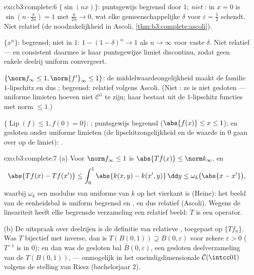 \begin{solution}{exo:b3:complete:6}
$\{\sin(nx)\}$: puntsgewijs begrensd door $1$; \emph{niet}
: in $x = 0$ is $\sin(n\cdot\frac{\pi}{2n}) = 1$ met
$\frac\pi{2n} \to 0$, wat elke gemeenschappelijke $\delta$ voor
$\varepsilon = \frac12$ schendt. Niet relatief  (de
noodzakelijkheid in Ascoli,
\cref{thm:b3:complete:ascoli}).

$\{x^n\}$: begrensd; niet  in $1$: $1 - (1 - \delta)^n
\to 1$ als $n \to \infty$ voor vaste $\delta$. Niet relatief
 --- en consistent daarmee is haar puntsgewijze limiet
discontinu, zodat geen enkele deelrij uniform convergeert.

$\{\norm f_\infty \leq 1, \norm{f'}_\infty \leq 1\}$: de
middelwaardeongelijkheid maakt de familie $1$-lipschitz en dus
; begrensd: relatief  volgens Ascoli. (Niet
: ze is niet gesloten --- uniforme limieten hoeven niet
$\mathcal C^1$ te zijn; haar  bestaat uit de
$1$-lipschitz functies met norm $\leq 1$.)

$\{\operatorname{Lip}(f) \leq 1, f(0) = 0\}$: ;
puntsgewijs begrensd ($\abs{f(x)} \leq x \leq 1$); en gesloten
onder uniforme limieten (de lipschitzongelijkheid en de waarde in
$0$ gaan over op de limiet): .
\end{solution}

\begin{solution}{exo:b3:complete:7}
(a) Voor $\norm f_\infty \leq 1$ is $\abs{Tf(x)} \leq
\norm k_\infty$, en
\[
\abs{Tf(x) - Tf(x')} \leq \int_0^1\abs{k(x,y) -
k(x',y)}\,\dd y \leq \omega_k\bigl(\abs{x - x'}\bigr),
\]
waarbij $\omega_k$ een modulus van uniforme  van $k$
op het  vierkant is (Heine): het beeld van de eenheidsbal
is uniform begrensd en , en dus relatief 
(Ascoli). Wegens de lineariteit heeft elke begrensde verzameling
een relatief  beeld: $T$ is een  operator.

(b) De uitspraak over deelrijen is de definitie van relatieve
, toegepast op $\{Tf_n\}$. Was $T$ bijectief met
 inverse, dan is $T(B(0,1)) \supseteq B(0, \varepsilon)$
voor zekere $\varepsilon > 0$ ($T^{-1}$ is  in $0$); en dan
was de gesloten bal $\bar B(0,\varepsilon)$, een gesloten
deelverzameling van de  $\overline{T(B(0,1))}$, 
--- onmogelijk in het oneindigdimensionale $\mathcal C(\intcc01)$
volgens de stelling van Riesz (bachelorjaar 2).
\end{solution}

